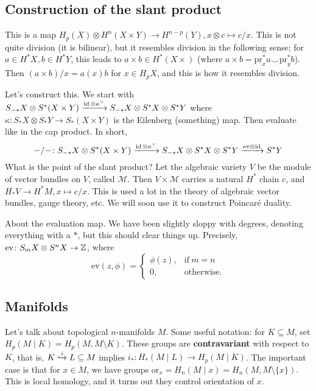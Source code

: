 \subsection*{Construction of the slant product}
This is a map $H_p(X) \otimes H^n (X \times Y) \to H ^{n-p}(Y), x\otimes c \mapsto  c /x$. This is not quite division (it is bilinear), but it resembles division in the following sense; for $a \in H^* X, b \in H^* Y$, this leads to $a \times b \in  H^*(X\times )$ (where $a \times b =  \mathrm{pr}^*_x a \smile \mathrm{pr}^*_y b$). Then $(a \times b) / x = a(x) b$ for $x \in H_pX$, and this is how it resembles division.

Let's construct this. We start with $S _{-*}X \otimes S^*(X \times Y) \xrightarrow{\operatorname{id}\otimes \kappa^{\vee}}  S _{-*}X\otimes S^* X\otimes S^* Y$ where $\kappa \colon S_*X \otimes S_* Y \to S_*(X \times Y)$ is the Eilenberg (something) map. Then evaluate like in the cap product. In short, \[
- / - \colon S _{-*}X \otimes S^*(X \times Y) \xrightarrow{\operatorname{id}\otimes \kappa^{\vee}} S _{-*}X\otimes S^* X\otimes S^* Y \xrightarrow{\mathrm{ev}\otimes \operatorname{id}} S^*Y
\] What is the point of the slant product? Let the algebraic variety $V$ be the module of vector bundles on $V$, called $\mathcal{M} $. Then $V \times \mathcal{M} $ carries a natural $H^*$ chain $c$, and $H_*V \to H^*M, x \mapsto c / x$. This is used a lot in the theory of algebraic vector bundles, gauge theory, etc. We will soon use it to construct Poincar\'e duality.

About the evaluation map. We have been slightly sloppy with degrees, denoting everything with a $*$, but this should clear things up. Precisely, $\mathrm{ev }\colon  S_m X \otimes  S^n  X \to \mathbb{Z}$, where 
\[
\mathrm{ev}(z, \phi)=
\begin{cases}
    \phi(z),& \text{if} \ m=n\\
    0, & \text{otherwise.} 
\end{cases}
\] 
\subsection*{Manifolds}
Let's talk about topological $n$-manifolds $M$. Some useful notation: for $K \subseteq M$, set  $H_p(M \mid K) = H_p(M,M \setminus K)$. These groups are \textbf{contravariant} with respect to $K$, that is, $K \lhook\joinrel\xrightarrow iL \subseteq M $ implies $i_* \colon H_*(M \mid L) \to H_p(M \mid K) $. The important case is that for $x \in M$, we have groups $\mathrm{or}_x=H_n (M \mid x)=H_n (M, M \setminus \{x\} )$. This is local homology, and it turns out they control orientation of $x$. 

